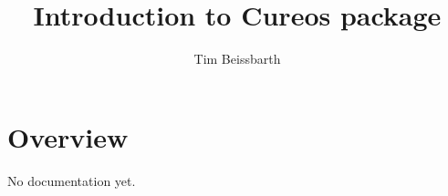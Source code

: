 \documentclass[12pt]{article}
\begin{document}
\author{Tim Beissbarth}

\title{Introduction to Cureos package}

\maketitle

\section{Overview}

No documentation yet.
\end{document}

